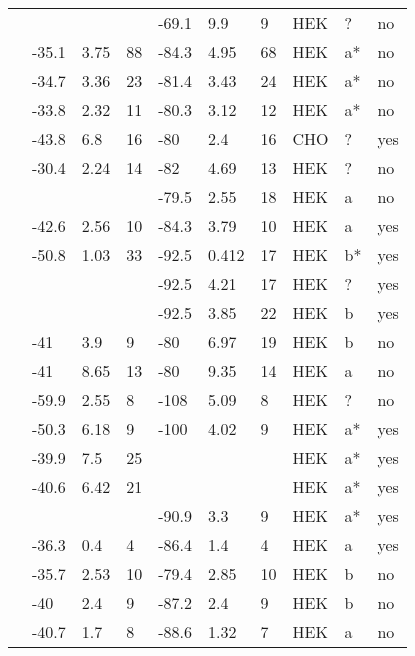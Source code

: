 \begin{longtable}{p{5cm}|lll|lll|lll}
\citet{Glaaser2012MutationDB} & && & -69.1 & 9.9 & 9 & HEK & ? & no \\
\citet{Guetter2013MutationDB} & -35.1 & 3.75 & 88 & -84.3 & 4.95 & 68 & HEK & a* & no \\
\citet{Gui2010aMutationDB} & -34.7 & 3.36 & 23 & -81.4 & 3.43 & 24 & HEK & a* & no \\
\citet{Gui2010bMutationDB} & -33.8 & 2.32 & 11 & -80.3 & 3.12 & 12 & HEK & a* & no \\
\citet{Hayashi2015MutationDB} & -43.8 & 6.8 & 16 & -80 & 2.4 & 16 & CHO & ? & yes \\
\citet{Holst2009MutationDB} & -30.4 & 2.24 & 14 & -82 & 4.69 & 13 & HEK & ? & no \\
\citet{Hoshi2014MutationDB} & && & -79.5 & 2.55 & 18 & HEK & a & no \\
\citet{Hsueh2009MutationDB} & -42.6 & 2.56 & 10 & -84.3 & 3.79 & 10 & HEK & a & yes \\
\citet{Hu2007MutationDB} & -50.8 & 1.03 & 33 & -92.5 & 0.412 & 17 & HEK & b* & yes \\
\citet{Hu2010MutationDB} & && & -92.5 & 4.21 & 17 & HEK & ? & yes \\
\citet{Hu2014MutationDB} & && & -92.5 & 3.85 & 22 & HEK & b & yes \\
\citet{Hu2015MutationDB} & -41 & 3.9 & 9 & -80 & 6.97 & 19 & HEK & b & no \\
\citet{Hu2015MutationDB} & -41 & 8.65 & 13 & -80 & 9.35 & 14 & HEK & a & no \\
\citet{Huang2006MutationDB} & -59.9 & 2.55 & 8 & -108 & 5.09 & 8 & HEK & ? & no \\
\citet{Huang2009MutationDB} & -50.3 & 6.18 & 9 & -100 & 4.02 & 9 & HEK & a* & yes \\
\citet{Itoh2005aMutationDB} & -39.9 & 7.5 & 25 & && & HEK & a* & yes \\
\citet{Itoh2005bMutationDB} & -40.6 & 6.42 & 21 & && & HEK & a* & yes \\
\citet{Itoh2007MutationDB} & && & -90.9 & 3.3 & 9 & HEK & a* & yes \\
\citet{Juang2014aMutationDB} & -36.3 & 0.4 & 4 & -86.4 & 1.4 & 4 & HEK & a & yes \\
\citet{Kapplinger2015MutationDB} & -35.7 & 2.53 & 10 & -79.4 & 2.85 & 10 & HEK & b & no \\
\citet{Kapplinger2015MutationDB} & -40 & 2.4 & 9 & -87.2 & 2.4 & 9 & HEK & b & no \\
\citet{Kapplinger2015MutationDB} & -40.7 & 1.7 & 8 & -88.6 & 1.32 & 7 & HEK & a & no \\

\end{longtable}
